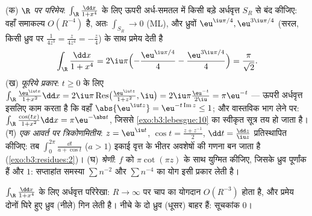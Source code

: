 \begin{example}[चार शास्त्रीय समाकल प्रकार]
\label{ex:b3:residues:integrals}
(क) \emph{$\R$ पर परिमेय}: $\int_\R\frac{\dd x}{1 +
x^4}$ के लिए ऊपरी अर्ध-समतल में किसी
बड़े अर्धवृत्त $S_R$ से बंद कीजिए: वहाँ समाकल्य $O(R^{-4})$ है, अतः
$\int_{S_R} \to 0$ (ML), और ध्रुवों $\eu^{\iu\pi/4}, \eu^{3\iu\pi/4}$ (सरल, किसी ध्रुव पर  $\frac1{4z^3} = \frac{z}{4z^4} = -\frac z4$) के
साथ  प्रमेय देती है
\[
\int_\R\frac{\dd x}{1 + x^4}
= 2\iu\pi\Bigl(-\frac{\eu^{\iu\pi/4}}4 -
\frac{\eu^{3\iu\pi/4}}4\Bigr)
= \frac{\pi}{\sqrt2} .
\]
(ख) \emph{फूरिये प्रकार}: $t \geq 0$ के लिए $\int_\R\frac{\eu^{\iu tx}}{1 + x^2}\dd x =
2\iu\pi\operatorname{Res}\bigl(\tfrac{\eu^{\iu tz}}{1+z^2},
\iu\bigr) = 2\iu\pi\frac{\eu^{-t}}{2\iu} = \pi\eu^{-t}$ --- ऊपरी अर्धवृत्त
इसलिए काम करता है कि वहाँ $\abs{\eu^{\iu tz}} =
\eu^{-t\operatorname{Im}z} \leq 1$; और वास्तविक भाग लेने पर: $\int_\R\frac{\cos(tx)}{1+x^2}\dd x = \pi\eu^{-\abs t}$,
जिससे \cref{exo:b3:lebesgue:10} का स्वीकृत सूत्र तय हो जाता है।
(ग) \emph{एक आवर्त पर त्रिकोणमितीय}: $z =
\eu^{\iu t}$, $\cos t = \frac{z + z^{-1}}2$, $\dd t =
\frac{\dd z}{\iu z}$
प्रतिस्थापित कीजिए: तब $\int_0^{2\pi}\frac{\dd t}{a + \cos t}$ ($a > 1$) इकाई वृत्त के भीतर अवशेषों की
गणना बन जाता है (\cref{exo:b3:residues:2})।
(घ) \emph{श्रेणी}: $f$ को $\pi\cot(\pi z)$ के साथ युग्मित कीजिए, जिसके
ध्रुव पूर्णांक हैं और  $1$: सप्ताहांत समस्या $\sum n^{-2}$ और
$\sum n^{-4}$ का योग इसी प्रकार लेती है।
\end{example}

\begin{omfigure}

{\small $\int_\R\frac{\dd x}{1 +
x^4}$ के लिए अर्धवृत्त परिरेखा: $R \to \infty$ पर चाप का योगदान
$O(R^{-3})$ होता है, और  प्रमेय दोनों घिरे हुए ध्रुव (नीले) गिन
लेती है। नीचे के दो ध्रुव (धूसर) बाहर हैं: सूचकांक $0$।}
\end{omfigure}

